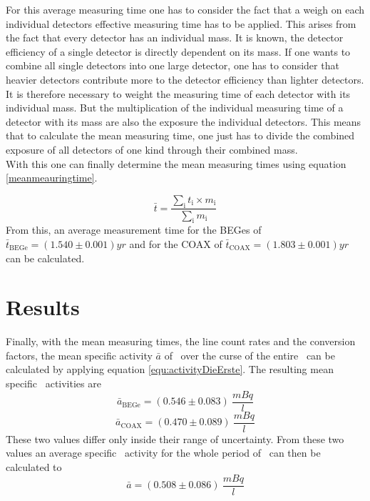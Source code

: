 \documentclass[encoding=utf8,british]{tumphthesis}
\begin{document}
For this average measuring time one has to consider the fact that a weigh on each individual detectors effective measuring time has to be applied.
This arises from the fact that every detector has an individual mass.
It is known, the detector efficiency of a single detector is directly dependent on its mass.
If one wants to combine all single detectors into one large detector, one has to consider that heavier detectors contribute more to the detector efficiency than lighter detectors.
It is therefore necessary to weight the measuring time of each detector with its individual mass.
But the multiplication of the individual measuring time of a detector with its mass are also the exposure the individual detectors.
This means that to calculate the mean measuring time, one just has to divide the combined exposure of all detectors of one kind through their combined mass.
\\

With this one can finally determine the mean measuring times using equation \ref{meanmeauringtime}.

\begin{equation*}
    \bar{t} = \frac{\sum_\mathrm{i} t_\mathrm{i} \times m_\mathrm{i}}{\sum_\mathrm{i} m_\mathrm{i}}
\label{meanmeauringtime}
\end{equation*}
From this, an average measurement time for the BEGes of $\bar{t}_{\mathrm{BEGe}} = (1.540\pm0.001) \unit{yr}$ and for the COAX of $\bar{t}_{\mathrm{COAX}} = (1.803\pm0.001) \unit{yr}$ can be calculated.
\\
\fi

\section{Results}
\label{sec:res}
Finally, with the mean measuring times, the line count rates and the conversion factors, the mean specific activity $\bar{a}$ of \Kr\ over the curse of the entire \PII\ can be calculated by applying equation \ref{equ:activityDieErste}.
The resulting mean specific \Kr\ activities are
\begin{equation*}
    \bar{a}_{\mathrm{BEGe}} = (0.546\pm0.083) \	\frac{\unit{mBq}}{\unit{l}}
\end{equation*}
\begin{equation*}
    \bar{a}_{\mathrm{COAX}} = (0.470\pm0.089) \	\frac{\unit{mBq}}{\unit{l}}
\end{equation*}
These two values differ only inside their range of uncertainty.
From these two values an average specific \Kr\ activity for the whole period of \PII\ can then be calculated to
\begin{equation*}
\bar{a} = (0.508\pm0.086) \ \frac{\unit{mBq}}{\unit{l}}
\end{equation*}
\\
\end{document}
